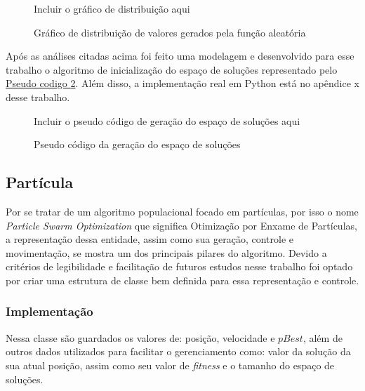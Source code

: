                 \begin{figure}[h]
                    \centering
                    \small{Incluir o gráfico de distribuição aqui}
                    \caption{Gráfico de distribuição de valores gerados pela função aleatória}
                    \label{fig:distrib-uniforme}
                \end{figure}
                

            Após as análises citadas acima foi feito uma modelagem e desenvolvido para esse trabalho o algoritmo de inicialização do espaço de soluções representado pelo 
            \hyperref[fig:pseudocodigo-solutionspace]{Pseudo codigo \ref{fig:pseudocodigo-solutionspace}}. 
            Além disso, a implementação real em Python está no apêndice x desse trabalho.\hfill

            \begin{figure}[h]
                \centering
                \small{Incluir o pseudo código de geração do espaço de soluções aqui}
                \caption{Pseudo código da geração do espaço de soluções}
                \label{fig:pseudocodigo-solutionspace}
            \end{figure}
        


    \subsection{Partícula}
            Por se tratar de um algoritmo populacional focado em partículas, por isso o nome \textit{Particle Swarm Optimization} que significa Otimização por Enxame de Partículas, a representação dessa entidade, assim como sua geração, controle e movimentação, se mostra um dos principais pilares do algoritmo. Devido a critérios de legibilidade e facilitação de futuros estudos nesse trabalho foi optado por criar uma estrutura de classe bem definida para essa representação e controle.
        

        \subsubsection{Implementação}
            Nessa classe são guardados os valores de: posição, velocidade e $pBest$, além de outros dados utilizados para facilitar o gerenciamento como: valor da solução da sua atual posição, assim como seu valor de \textit{fitness} e o tamanho do espaço de soluções. \newline

